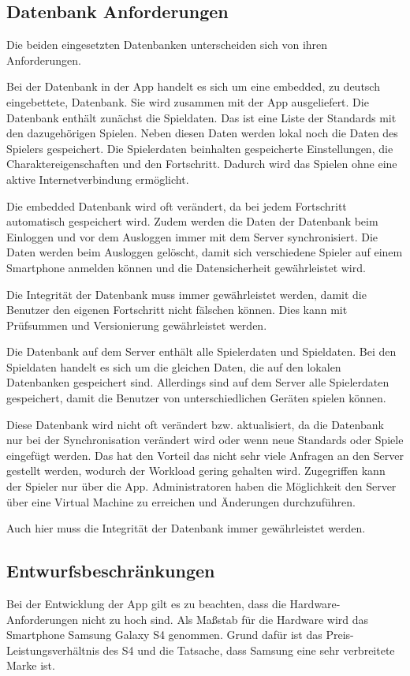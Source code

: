 	\subsection{Datenbank Anforderungen}
		Die beiden eingesetzten Datenbanken unterscheiden sich von ihren Anforderungen.
		
		Bei der Datenbank in der App handelt es sich um eine embedded, zu deutsch eingebettete, Datenbank. Sie wird zusammen mit der App ausgeliefert. Die Datenbank enthält zunächst die Spieldaten. Das ist eine Liste der Standards mit den dazugehörigen Spielen. Neben diesen Daten werden lokal noch die Daten des Spielers gespeichert. Die Spielerdaten beinhalten gespeicherte Einstellungen, die Charaktereigenschaften und den Fortschritt. Dadurch wird das Spielen ohne eine aktive Internetverbindung ermöglicht.
		
		Die embedded Datenbank wird oft verändert, da bei jedem Fortschritt automatisch gespeichert wird. Zudem werden die Daten der Datenbank beim Einloggen und vor dem Ausloggen immer mit dem Server synchronisiert. Die Daten werden beim Ausloggen gelöscht, damit sich verschiedene Spieler auf einem Smartphone anmelden können und die Datensicherheit gewährleistet wird.
		
		Die Integrität der Datenbank muss immer gewährleistet werden, damit die Benutzer den eigenen Fortschritt nicht fälschen können. Dies kann mit Prüfsummen und Versionierung gewährleistet werden.
		
		Die Datenbank auf dem Server enthält alle Spielerdaten und Spieldaten. Bei den Spieldaten handelt es sich um die gleichen Daten, die auf den lokalen Datenbanken gespeichert sind.  Allerdings sind auf dem Server alle Spielerdaten gespeichert, damit die Benutzer von unterschiedlichen Geräten spielen können. 
		
		Diese Datenbank wird nicht oft verändert bzw. aktualisiert, da die Datenbank nur bei der Synchronisation verändert wird oder wenn neue Standards oder Spiele eingefügt werden. Das hat den Vorteil das nicht sehr viele Anfragen an den Server gestellt werden, wodurch der Workload gering gehalten wird. Zugegriffen kann der Spieler nur über die App. Administratoren haben die Möglichkeit den Server über eine Virtual Machine zu erreichen und Änderungen durchzuführen. 
		
		Auch hier muss die Integrität der Datenbank immer gewährleistet werden.
	
	\subsection{Entwurfsbeschränkungen}
		Bei der Entwicklung der App gilt es zu beachten, dass die Hardware-Anforderungen nicht zu hoch sind. Als Maßstab für die Hardware wird das Smartphone Samsung Galaxy S4 genommen. Grund dafür ist das Preis-Leistungsverhältnis des S4 und die Tatsache, dass Samsung eine sehr verbreitete Marke ist.
		
